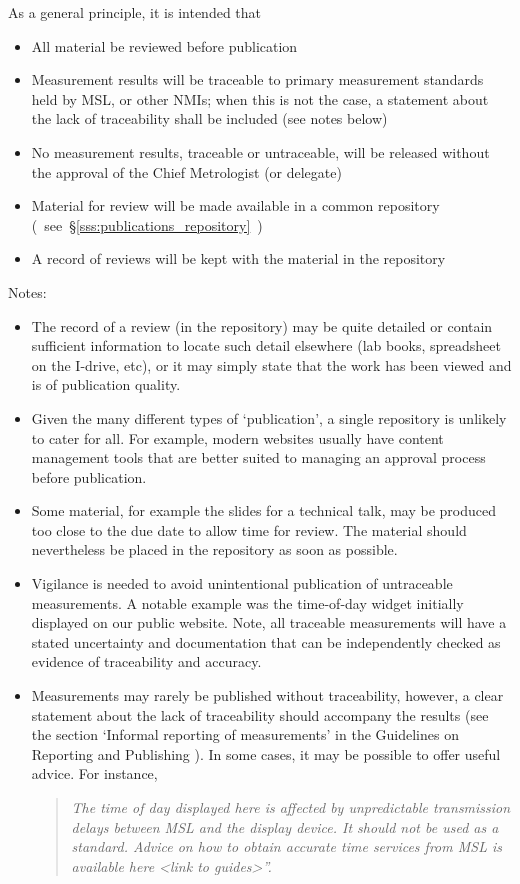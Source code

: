 As a general principle, it is intended that
\begin{itemize}
\item  All material be reviewed before publication
\item  Measurement results will be traceable to primary measurement standards held by 
MSL, or other NMIs; when this is not the case, a statement about the lack of traceability shall be included (see notes below)
\item  No measurement results, traceable or untraceable, will be released without the approval of the Chief Metrologist (or delegate) 
\item  Material for review will be made available in a common repository (~see~\S\ref{sss:publications_repository}~)
\item  A record of reviews will be kept with the material in the repository 
\end{itemize}
Notes: 
\begin{itemize}
\item  The record of a review (in the repository) may be quite detailed or contain sufficient information to locate such detail elsewhere (lab books, spreadsheet on the I-drive, etc), or it may simply state that the work has been viewed and is of publication quality.  
\item  Given the many different types of ‘publication’, a single repository is unlikely to cater for all. For example, modern websites usually have content management tools that are better suited to managing an approval process before publication.  
\item  Some material, for example the slides for a technical talk, may be produced too close to the due date to allow time for review. The material should nevertheless be placed in the repository as soon as possible. 
\item  Vigilance is needed to avoid unintentional publication of untraceable measurements. A notable example was the time-of-day widget initially displayed on our public website. Note, all traceable measurements will have a stated uncertainty and documentation that can be independently checked as evidence of traceability and accuracy.
\item  Measurements may rarely be published without traceability, however, a clear statement about the lack of traceability should accompany the results (see the section ‘Informal reporting of measurements’ in the Guidelines on Reporting and Publishing \cite[\S\ref*{GRP-ss:informal_reporting}]{MSL_Reporting_Guidelines}). In some cases, it may be possible to offer useful advice. For instance, 
\begin{quote}\textit{
The time of day displayed here is affected by unpredictable transmission delays between MSL and the display device. It should not be used as a standard. Advice on how to obtain accurate time services from MSL is available here <link to guides>”.
}\end{quote} 
\end{itemize}

